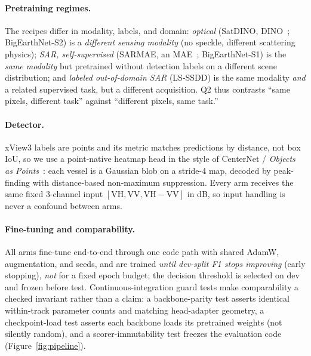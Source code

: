 \documentclass[10pt,twocolumn,letterpaper]{article}
\begin{document}
\paragraph{Pretraining regimes.} The recipes differ in modality, labels, and
domain: \emph{optical} (SatDINO, DINO~\cite{caron2021emerging}; BigEarthNet-S2)
is a \emph{different sensing modality} (no speckle, different scattering
physics); \emph{SAR, self-supervised} (SARMAE, an MAE~\cite{he2022masked};
BigEarthNet-S1) is the \emph{same modality} but pretrained without detection
labels on a different scene distribution; and \emph{labeled out-of-domain SAR}
(LS-SSDD) is the same modality \emph{and} a related supervised task, but a
different acquisition. Q2 thus contrasts ``same pixels, different task'' against
``different pixels, same task.''

\paragraph{Detector.} xView3 labels are points and its metric matches
predictions by distance, not box IoU, so we use a point-native heatmap head in
the style of CenterNet / \emph{Objects as Points}~\cite{zhou2019objects}: each
vessel is a Gaussian blob on a stride-4 map, decoded by peak-finding with
distance-based non-maximum suppression. Every arm receives the same fixed
3-channel input $[\mathrm{VH},\mathrm{VV},\mathrm{VH}{-}\mathrm{VV}]$ in dB, so
input handling is never a confound between arms.

\paragraph{Fine-tuning and comparability.} All arms fine-tune end-to-end through
one code path with shared AdamW, augmentation, and seeds, and are trained
\emph{until dev-split F1 stops improving} (early stopping), \emph{not} for a
fixed epoch budget; the decision threshold is selected on dev and frozen before
test. Continuous-integration guard tests make comparability a checked invariant
rather than a claim: a backbone-parity test asserts identical within-track
parameter counts and matching head-adapter geometry, a checkpoint-load test
asserts each backbone loads its pretrained weights (not silently random), and a
scorer-immutability test freezes the evaluation code (Figure~\ref{fig:pipeline}).
\end{document}
